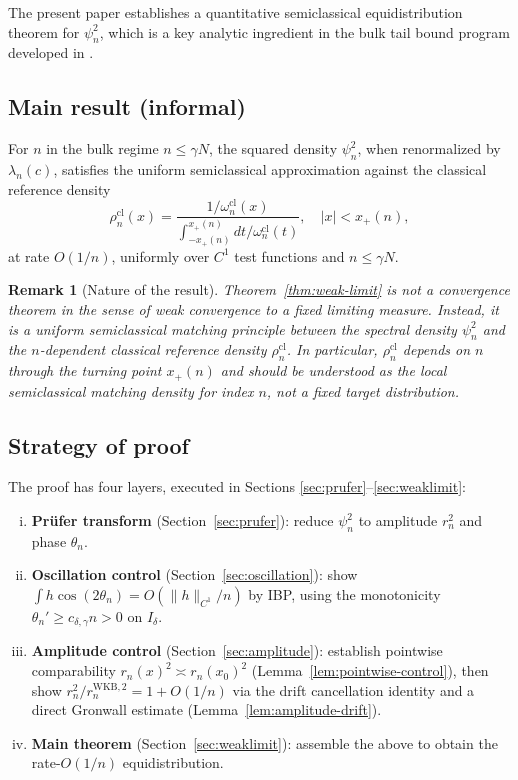 \documentclass[12pt,a4paper]{amsart}
\newtheorem{remark}[theorem]{Remark}
\newcommand{\psin}{\psi_n}
\newcommand{\wncl}{\omega_n^{\mathrm{cl}}}
\newcommand{\rhocl}{\rho^{\mathrm{cl}}}
\begin{document}
The present paper establishes a quantitative semiclassical
equidistribution theorem for $\psin^2$, which is a key analytic
ingredient in the bulk tail bound program developed in
\cite{PaperI,PaperII,PaperIII}.

\subsection{Main result (informal)}

For $n$ in the bulk regime $n \le \gamma N$, the squared density
$\psin^2$, when renormalized by $\lambda_n(c)$, satisfies the
uniform semiclassical approximation against the classical
reference density
\[
  \rhocl_n(x) =
  \frac{1/\wncl(x)}{\int_{-x_+(n)}^{x_+(n)}
                  dt/\wncl(t)},
  \quad |x| < x_+(n),
\]
at rate $O(1/n)$, uniformly over $C^1$ test functions and
$n \le \gamma N$.

\begin{remark}[Nature of the result]\label{rem:not-weak-conv}
Theorem~\ref{thm:weak-limit} is \emph{not} a convergence theorem
in the sense of weak convergence to a fixed limiting measure.
Instead, it is a \emph{uniform semiclassical matching principle}
between the spectral density $\psin^2$ and the $n$-dependent
classical reference density $\rhocl_n$.
In particular, $\rhocl_n$ depends on $n$ through the turning
point $x_+(n)$ and should be understood as the
\emph{local semiclassical matching density} for index $n$,
not a fixed target distribution.
\end{remark}

\subsection{Strategy of proof}

The proof has four layers, executed in Sections
\ref{sec:prufer}--\ref{sec:weaklimit}:

\begin{enumerate}[(i)]
  \item \textbf{Pr\"ufer transform} (Section~\ref{sec:prufer}):
  reduce $\psin^2$ to amplitude $r_n^2$ and phase $\theta_n$.
  \item \textbf{Oscillation control}
  (Section~\ref{sec:oscillation}):
  show $\int h\cos(2\theta_n) = O(\|h\|_{C^1}/n)$ by IBP,
  using the monotonicity $\theta_n' \ge c_{\delta,\gamma}n > 0$
  on $I_\delta$.
  \item \textbf{Amplitude control}
  (Section~\ref{sec:amplitude}):
  establish pointwise comparability
  $r_n(x)^2 \asymp r_n(x_0)^2$
  (Lemma~\ref{lem:pointwise-control}),
  then show $r_n^2/r_n^{\mathrm{WKB},2} = 1 + O(1/n)$
  via the drift cancellation identity and a direct
  Gronwall estimate (Lemma~\ref{lem:amplitude-drift}).
  \item \textbf{Main theorem} (Section~\ref{sec:weaklimit}):
  assemble the above to obtain the rate-$O(1/n)$
  equidistribution.
\end{enumerate}
\end{document}
